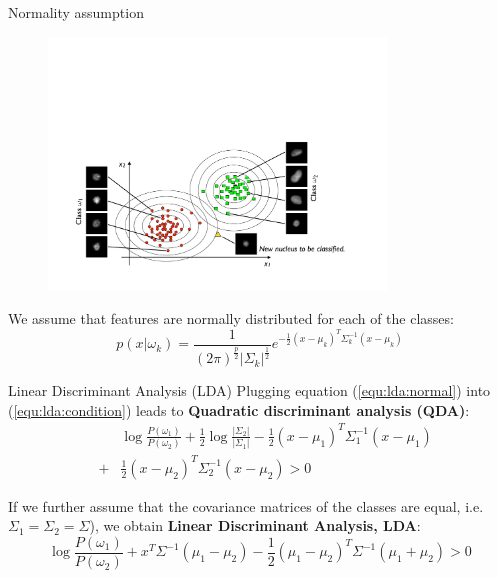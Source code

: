 \documentclass[xcolor=pdftex,dvipsnames,table]{beamer}
\begin{document}
\begin{frame}{Normality assumption}
\begin{figure}[htb]
\includegraphics[width=0.8\textwidth]{../graphics/LDA1.pdf}
\end{figure}
We assume that features are normally distributed for each of the classes:
\begin{equation}\label{equ:lda:normal}
p(x|\omega_k)=\frac{1}{(2\pi)^{\frac{p}{2}}|\Sigma_k|^{\frac{1}{2}}}e^{-\frac{1}{2}(x-\mu_k)^T\Sigma_k^{-1}(x-\mu_k)}
\end{equation}
\end{frame}

\begin{frame}{Linear Discriminant Analysis (LDA)}
Plugging equation (\ref{equ:lda:normal}) into (\ref{equ:lda:condition}) leads to {\bf Quadratic discriminant analysis (QDA)}:
\begin{eqnarray*}
&& \log{\frac{P(\omega_1)}{P(\omega_2)}} +
\frac{1}{2}\log{\frac{|\Sigma_2|}{|\Sigma_1|}}
- \frac{1}{2}(x-\mu_1)^T\Sigma_1^{-1}(x-\mu_1) \nonumber \\
&+& \frac{1}{2}(x-\mu_2)^T\Sigma_2^{-1}(x-\mu_2) > 0
\end{eqnarray*}


If we further assume that the covariance matrices of the classes are equal, i.e. $\Sigma_1 = \Sigma_2 = \Sigma$), we obtain {\bf Linear Discriminant Analysis, LDA}:
\begin{equation*}
\log{\frac{P(\omega_1)}{P(\omega_2)}} + x^T\Sigma^{-1}(\mu_1-\mu_2) - \frac{1}{2}(\mu_1-\mu_2)^T\Sigma^{-1}(\mu_1+\mu_2) > 0
\end{equation*}
\end{frame}
\end{document}
